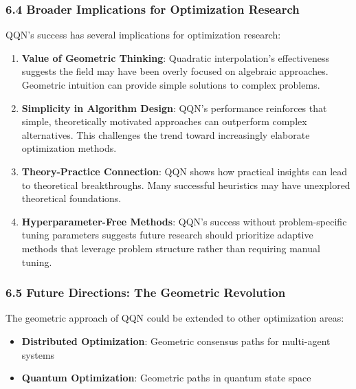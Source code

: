 \hypertarget{broader-implications-for-optimization-research}{%
\subsubsection{6.4 Broader Implications for Optimization Research}\label{broader-implications-for-optimization-research}}

QQN's success has several implications for optimization research:

\begin{enumerate}
\def\labelenumi{\arabic{enumi}.}
\item
  \textbf{Value of Geometric Thinking}: Quadratic interpolation's effectiveness suggests the field may have been overly focused on algebraic approaches. Geometric intuition can provide simple solutions to complex problems.
\item
  \textbf{Simplicity in Algorithm Design}: QQN's performance reinforces that simple, theoretically motivated approaches can outperform complex alternatives. This challenges the trend toward increasingly elaborate optimization methods.
\item
  \textbf{Theory-Practice Connection}: QQN shows how practical insights can lead to theoretical breakthroughs. Many successful heuristics may have unexplored theoretical foundations.
\item
  \textbf{Hyperparameter-Free Methods}: QQN's success without problem-specific tuning parameters suggests future research should prioritize adaptive methods that leverage problem structure rather than requiring manual tuning.
\end{enumerate}

\hypertarget{future-directions-the-geometric-revolution}{%
\subsubsection{6.5 Future Directions: The Geometric Revolution}\label{future-directions-the-geometric-revolution}}

The geometric approach of QQN could be extended to other optimization areas:

\begin{itemize}
\tightlist
\item
  \textbf{Distributed Optimization}: Geometric consensus paths for multi-agent systems
\item
  \textbf{Quantum Optimization}: Geometric paths in quantum state space
\end{itemize}


